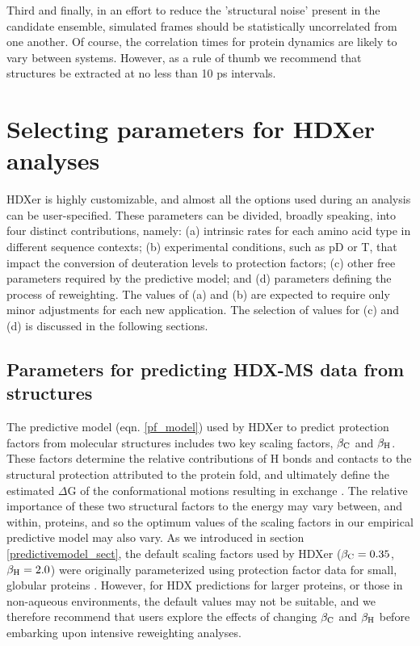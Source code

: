 \documentclass[9pt,tutorial]{livecoms}
\begin{document}
Third and finally, in an effort to reduce the 'structural noise' present in the candidate ensemble, simulated frames should be statistically uncorrelated from one another.
Of course, the correlation times for protein dynamics are likely to vary between systems.
However, as a rule of thumb we recommend that structures be extracted at no less than 10 ps intervals.

\section{Selecting parameters for HDXer analyses}
HDXer is highly customizable, and almost all the options used during an analysis can be user-specified. 
These parameters can be divided, broadly speaking, into four distinct contributions, namely: (a) intrinsic rates for each amino acid type in different sequence contexts; (b) experimental conditions, such as pD or T, that impact the conversion of deuteration levels to protection factors; (c) other free parameters required by the predictive model; and (d) parameters defining the process of reweighting. 
The values of (a) and (b) are expected to require only minor adjustments for each new application.
The selection of values for (c) and (d) is discussed in the following sections.

\subsection{Parameters for predicting HDX-MS data from structures}\label{choosingbetaparams_sect}
The predictive model (eqn. \ref{pf_model}) used by HDXer to predict protection factors from molecular structures includes two key scaling factors, $\beta_\textnormal{C}$ and $\beta_\textnormal{H}$.
These factors determine the relative contributions of H bonds and contacts to the structural protection attributed to the protein fold, and ultimately define the estimated $\Delta$G of the conformational motions resulting in exchange \cite{VendruscoloPaci2003, BestVendruscolo2006}.
The relative importance of these two structural factors to the energy may vary between, and within, proteins, and so the optimum values of the scaling factors in our empirical predictive model may also vary.
As we introduced in section \ref{predictivemodel_sect}, the default scaling factors used by HDXer ($\beta_\textnormal{C} = 0.35$, $\beta_\textnormal{H} = 2.0$) were originally parameterized using protection factor data for small, globular proteins \cite{BestVendruscolo2006}.
However, for HDX predictions for larger proteins, or those in non-aqueous environments, the default values may not be suitable, and we therefore recommend that users explore the effects of changing $\beta_\textnormal{C}$ and $\beta_\textnormal{H}$ before embarking upon intensive reweighting analyses.
\end{document}

